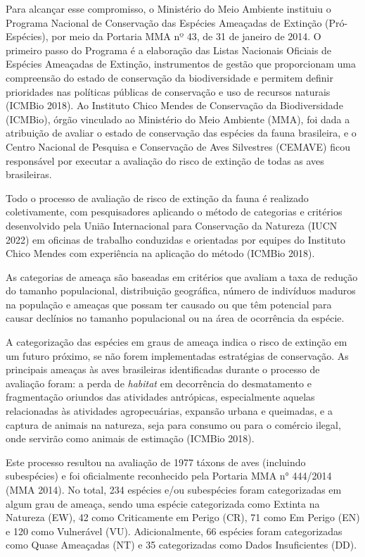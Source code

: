 \documentclass[
  oneside]{scrbook}
\begin{document}
Para alcançar esse compromisso, o Ministério do Meio Ambiente instituiu o Programa Nacional de Conservação das Espécies Ameaçadas de Extinção (Pró-Espécies), por meio da Portaria MMA nº 43, de 31 de janeiro de 2014. O primeiro passo do Programa é a elaboração das Listas Nacionais Oficiais de Espécies Ameaçadas de Extinção, instrumentos de gestão que proporcionam uma compreensão do estado de conservação da biodiversidade e permitem definir prioridades nas políticas públicas de conservação e uso de recursos naturais (ICMBio 2018). Ao Instituto Chico Mendes de Conservação da Biodiversidade (ICMBio), órgão vinculado ao Ministério do Meio Ambiente (MMA), foi dada a atribuição de avaliar o estado de conservação das espécies da fauna brasileira, e o Centro Nacional de Pesquisa e Conservação de Aves Silvestres (CEMAVE) ficou responsável por executar a avaliação do risco de extinção de todas as aves brasileiras.

Todo o processo de avaliação de risco de extinção da fauna é realizado coletivamente, com pesquisadores aplicando o método de categorias e critérios desenvolvido pela União Internacional para Conservação da Natureza (IUCN 2022) em oficinas de trabalho conduzidas e orientadas por equipes do Instituto Chico Mendes com experiência na aplicação do método (ICMBio 2018).

As categorias de ameaça são baseadas em critérios que avaliam a taxa de redução do tamanho populacional, distribuição geográfica, número de indivíduos maduros na população e ameaças que possam ter causado ou que têm potencial para causar declínios no tamanho populacional ou na área de ocorrência da espécie.

A categorização das espécies em graus de ameaça indica o risco de extinção em um futuro próximo, se não forem implementadas estratégias de conservação. As principais ameaças às aves brasileiras identificadas durante o processo de avaliação foram: a perda de \emph{habitat} em decorrência do desmatamento e fragmentação oriundos das atividades antrópicas, especialmente aquelas relacionadas às atividades agropecuárias, expansão urbana e queimadas, e a captura de animais na natureza, seja para consumo ou para o comércio ilegal, onde servirão como animais de estimação (ICMBio 2018).

Este processo resultou na avaliação de 1977 táxons de aves (incluindo subespécies) e foi oficialmente reconhecido pela Portaria MMA n° 444/2014 (MMA 2014). No total, 234 espécies e/ou subespécies foram categorizadas em algum grau de ameaça, sendo uma espécie categorizada como Extinta na Natureza (EW), 42 como Criticamente em Perigo (CR), 71 como Em Perigo (EN) e 120 como Vulnerável (VU). Adicionalmente, 66 espécies foram categorizadas como Quase Ameaçadas (NT) e 35 categorizadas como Dados Insuficientes (DD).
\end{document}
